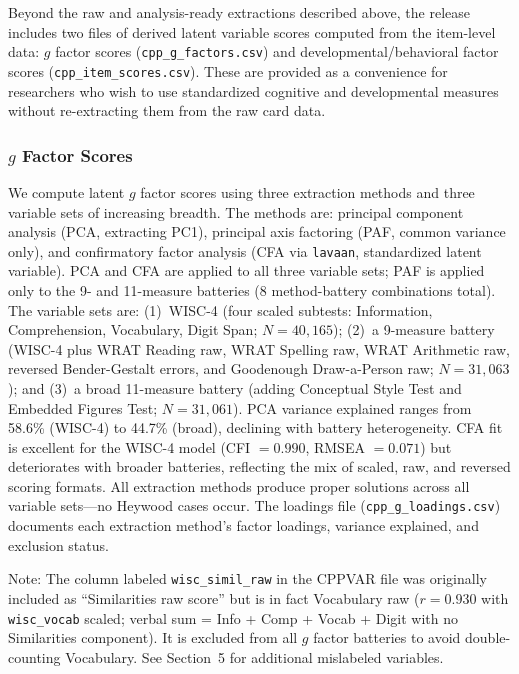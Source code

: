 \documentclass[12pt]{article}
\begin{document}
Beyond the raw and analysis-ready extractions described above, the release includes two files of derived latent variable scores computed from the item-level data: $g$ factor scores (\texttt{cpp\_g\_factors.csv}) and developmental/behavioral factor scores (\texttt{cpp\_item\_scores.csv}). These are provided as a convenience for researchers who wish to use standardized cognitive and developmental measures without re-extracting them from the raw card data.

\subsubsection{$g$ Factor Scores}

We compute latent $g$ factor scores using three extraction methods and three variable sets of increasing breadth. The methods are: principal component analysis (PCA, extracting PC1), principal axis factoring (PAF, common variance only), and confirmatory factor analysis (CFA via \texttt{lavaan}, standardized latent variable). PCA and CFA are applied to all three variable sets; PAF is applied only to the 9- and 11-measure batteries (8 method-battery combinations total). The variable sets are: (1)~WISC-4 (four scaled subtests: Information, Comprehension, Vocabulary, Digit Span; $N = 40{,}165$); (2)~a 9-measure battery (WISC-4 plus WRAT Reading raw, WRAT Spelling raw, WRAT Arithmetic raw, reversed Bender-Gestalt errors, and Goodenough Draw-a-Person raw; $N = 31{,}063$); and (3)~a broad 11-measure battery (adding Conceptual Style Test and Embedded Figures Test; $N = 31{,}061$). PCA variance explained ranges from 58.6\% (WISC-4) to 44.7\% (broad), declining with battery heterogeneity. CFA fit is excellent for the WISC-4 model (CFI $= 0.990$, RMSEA $= 0.071$) but deteriorates with broader batteries, reflecting the mix of scaled, raw, and reversed scoring formats. All extraction methods produce proper solutions across all variable sets---no Heywood cases occur. The loadings file (\texttt{cpp\_g\_loadings.csv}) documents each extraction method's factor loadings, variance explained, and exclusion status.

Note: The column labeled \texttt{wisc\_simil\_raw} in the CPPVAR file was originally included as ``Similarities raw score'' but is in fact Vocabulary raw ($r = 0.930$ with \texttt{wisc\_vocab} scaled; verbal sum = Info + Comp + Vocab + Digit with no Similarities component). It is excluded from all $g$ factor batteries to avoid double-counting Vocabulary. See Section~5 for additional mislabeled variables.
\end{document}
